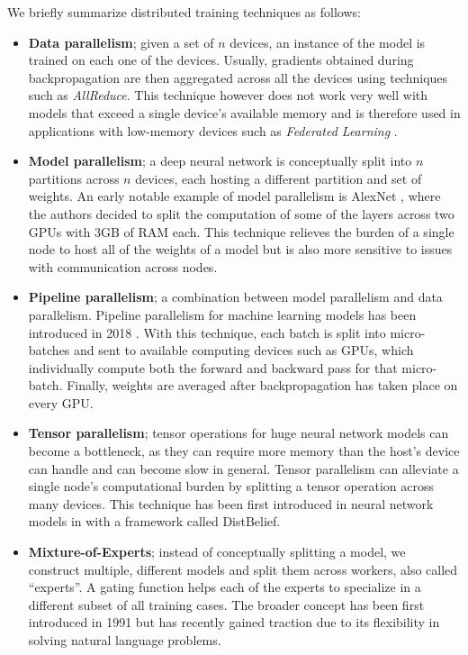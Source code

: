 We briefly summarize distributed training techniques as follows:
\begin{itemize}
    \item \textbf{Data parallelism};
          given a set of $n$ devices, an instance of the model is trained on each one of the devices.
          Usually, gradients obtained during backpropagation are then aggregated across all the devices using techniques such as \textit{AllReduce}.
          This technique however does not work very well with models that exceed a single device's available memory and is therefore used in applications with low-memory devices such as \textit{Federated Learning} \cite{li2019federatedlearning}.

    \item \textbf{Model parallelism};
          a deep neural network is conceptually split into $n$ partitions across $n$ devices, each hosting a different partition and set of weights.
          An early notable example of model parallelism is AlexNet \cite{alexnet2012}, where the authors decided to split the computation of some of the layers across two GPUs with 3GB of RAM each.
          This technique relieves the burden of a single node to host all of the weights of a model but is also more sensitive to issues with communication across nodes.

    \item \textbf{Pipeline parallelism};
          a combination between model parallelism and data parallelism.
          Pipeline parallelism for machine learning models has been introduced in 2018 \cite{huang2018gpipe}.
          With this technique, each batch is split into micro-batches and sent to available computing devices such as GPUs, which individually compute both the forward and backward pass for that micro-batch.
          Finally, weights are averaged after backpropagation has taken place on every GPU.

    \item \textbf{Tensor parallelism};
          tensor operations for huge neural network models can become a bottleneck, as they can require more memory than the host's device can handle and can become slow in general.
          Tensor parallelism can alleviate a single node's computational burden by splitting a tensor operation across many devices.
          This technique has been first introduced in neural network models in \cite{dean2012distbelief} with a framework called DistBelief.

    \item \textbf{Mixture-of-Experts};
          instead of conceptually splitting a model, we construct multiple, different models and split them across workers, also called ``experts''.
          A gating function helps each of the experts to specialize in a different subset of all training cases.
          The broader concept has been first introduced in 1991 \cite{Jacobs1991mixtureofexperts} but has recently gained traction due to its flexibility in solving natural language problems.
\end{itemize}

